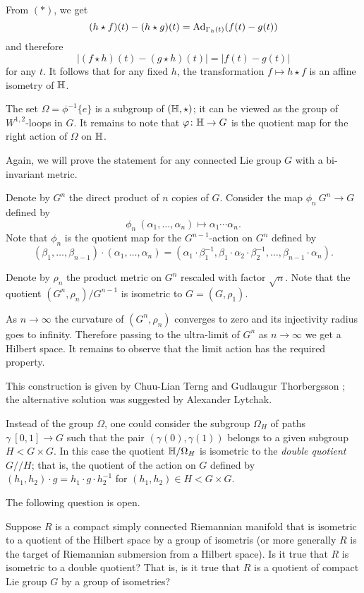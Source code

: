 From $({*})$, we get
\[(h\star f)(t)-(h\star g)(t)=\mathrm{Ad}_{\Gamma_h(t)}(f(t)-g(t))\]
and therefore
\[|(f\star h)(t)-(g\star h)(t)|=|f(t)-g(t)|\]
for any $t$.
It follows that for any fixed $h$,
the transformation $f\mapsto h\star f$ is an affine isometry of $\mathbb{H}$.


The set $\Omega=\phi^{-1}\{e\}$ is a subgroup of $(\mathbb{H},\star)$;
it can be viewed as the group of $W^{1,2}$-loops in $G$.
It remains to note that $\varphi\colon\mathbb{H}\to G$ is the quotient map for the right action of $\Omega$ on $\mathbb{H}$.
\qeds

 Again, we will prove the statement for any connected Lie group $G$ with a bi-invariant metric.

Denote by $G^n$ the direct product of $n$ copies of $G$.
Consider the map $\phi_n\:G^n\to G$ defined by
\[\phi_n\:(\alpha_1,\dots,\alpha_n)\mapsto \alpha_1\cdots\alpha_n.\]
Note that $\phi_n$ is the quotient map for the $G^{n-1}$-action on $G^n$ defined by
\[(\beta_1,\dots,\beta_{n-1})\cdot(\alpha_1,\dots,\alpha_n)=(\alpha_1\cdot\beta_1^{-1},\beta_1\cdot\alpha_2\cdot\beta_2^{-1},\dots,\beta_{n-1}\cdot\alpha_n).\]

Denote by $\rho_n$ the product metric on $G^n$ rescaled with factor $\sqrt{n}$.
Note that the quotient $(G^n,\rho_n)/G^{n-1}$ is isometric to $G=(G,\rho_1)$.

As $n\to\infty$ the curvature of $(G^n,\rho_n)$ converges to zero and its injectivity radius goes to infinity.
Therefore passing to the ultra-limit of $G^n$ as $n\to\infty$ we get a Hilbert space.
It remains to observe that the limit action has the required property.
\qeds

This construction is given by Chuu-Lian Terng and Gudlaugur Thorbergsson \cite[see section 4 in][]{terng-thorbergsson};
the alternative solution was suggested by Alexander Lytchak.

Instead of the group $\Omega$, 
one could consider the subgroup $\Omega_H$ of paths $\gamma\:[0,1]\to G$ such that the pair $(\gamma(0),\gamma(1))$ belongs to a given subgroup $H<G\times G$.
In this case the quotient $\mathbb{H}/\Omega_H$ is isometric to the \emph{double quotient} $G/\!\!/H$;
that is, the quotient of the action on $G$ defined by $(h_1,h_2)\cdot g=h_1\cdot g\cdot h_2^{-1}$ for $(h_1,h_2)\in H<G\times G$.


The following question is open.

\begin{pr} Suppose $R$ is a compact simply connected Riemannian manifold that is isometric to a quotient of the Hilbert space by a group of isometris (or more generally $R$ is the target of Riemannian submersion from a Hilbert space).
Is it true that $R$ is isometric to a double quotient? That is, is it true that $R$ is a quotient of compact Lie group $G$ by a group of isometries?
 
\end{pr}
